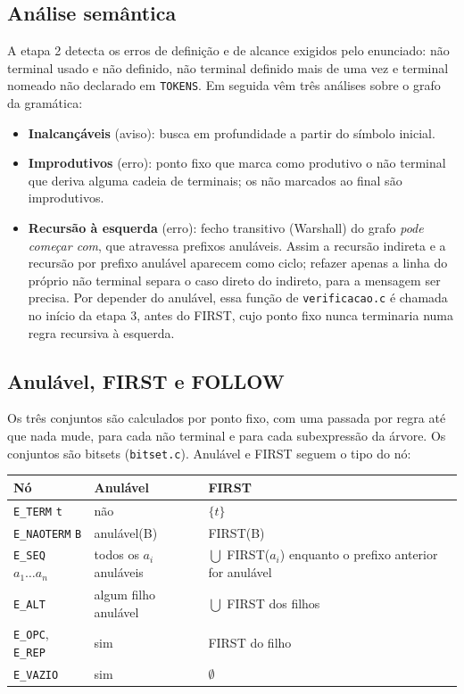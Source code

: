 \documentclass[11pt,a4paper]{article}
\begin{document}
\subsection{Análise semântica}

A etapa 2 detecta os erros de definição e de alcance exigidos pelo enunciado: não terminal usado
e não definido, não terminal definido mais de uma vez e terminal nomeado não declarado em
\texttt{TOKENS}. Em seguida vêm três análises sobre o grafo da gramática:
\begin{itemize}
\item \textbf{Inalcançáveis} (aviso): busca em profundidade a partir do símbolo inicial.
\item \textbf{Improdutivos} (erro): ponto fixo que marca como produtivo o não terminal que
  deriva alguma cadeia de terminais; os não marcados ao final são improdutivos.
\item \textbf{Recursão à esquerda} (erro): fecho transitivo (Warshall) do grafo \emph{pode
  começar com}, que atravessa prefixos anuláveis. Assim a recursão indireta e a recursão por
  prefixo anulável aparecem como ciclo; refazer apenas a linha do próprio não terminal separa o
  caso direto do indireto, para a mensagem ser precisa. Por depender do anulável, essa função
  de \texttt{verificacao.c} é chamada no início da etapa 3, antes do FIRST, cujo ponto fixo
  nunca terminaria numa regra recursiva à esquerda.
\end{itemize}

\subsection{Anulável, FIRST e FOLLOW}

Os três conjuntos são calculados por ponto fixo, com uma passada por regra até que nada mude,
para cada não terminal e para cada subexpressão da árvore. Os conjuntos são bitsets
(\texttt{bitset.c}). Anulável e FIRST seguem o tipo do nó:

\begin{center}
\begin{tabular}{@{}lll@{}}
\toprule
Nó & Anulável & FIRST \\
\midrule
\texttt{E\_TERM} \texttt{t} & não & $\{t\}$ \\
\texttt{E\_NAOTERM} \texttt{B} & anulável(B) & FIRST(B) \\
\texttt{E\_SEQ} $a_1 \dots a_n$ & todos os $a_i$ anuláveis & $\bigcup$ FIRST($a_i$) enquanto o prefixo anterior for anulável \\
\texttt{E\_ALT} & algum filho anulável & $\bigcup$ FIRST dos filhos \\
\texttt{E\_OPC}, \texttt{E\_REP} & sim & FIRST do filho \\
\texttt{E\_VAZIO} & sim & $\emptyset$ \\
\bottomrule
\end{tabular}
\end{center}
\end{document}
